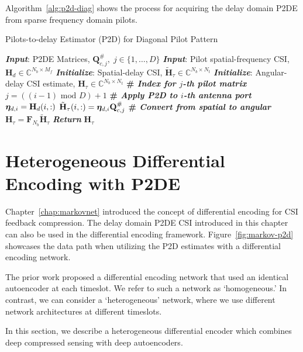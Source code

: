 Algorithm~\ref{alg:p2d-diag} shows the process for acquiring the delay domain P2DE from sparse frequency domain pilots.

\begin{algorithm}
    \caption{Pilots-to-delay Estimator (P2D) for Diagonal Pilot Pattern} 
    \label{alg:p2d-diag}
    \begin{algorithmic}[1]
    \State \textbf{\emph{Input}}:
        P2DE Matrices, $\mathbf{Q}_{c,j}^\#,\;
        j\in\{1,\dots, D\}$
    \State \textbf{\emph{Input}}: Pilot spatial-frequency CSI, $\mathbf{H}_d\in\mathbb{C}^{N_b\times M_f}$
    \State \textbf{\emph{Initialize}}: Spatial-delay CSI, $\tilde{\mathbf{H}}_\tau\in\mathbb{C}^{N_b\times N_t}$
   \State \textbf{\emph{Initialize}}: Angular-delay CSI estimate, ${\mathbf{H}}_\tau
              \in\mathbb{C}^{N_b\times N_t}$
        \State \textbf{\# \emph{Index for $j$-th pilot matrix}}
        \State $j = ((i-1) \text{ mod } D) + 1$
        \State \textbf{\# \emph{Apply P2D to $i$-th antenna port}}
        \State ${\boldsymbol{\eta}}_{d,i} = \mathbf{H}_d(i,:)$
        \State $\tilde{{\mathbf{H}}}_{\tau}(i,:) = {\boldsymbol{\eta}}_{d,i}\mathbf{Q}^{\#}_{c,j}$
        \EndFor
        \State \textbf{\# \emph{Convert from spatial to angular}}
        \State ${{\mathbf{H}}}_{\tau}=\mathbf{F}_{N_b}\tilde{{\mathbf{H}}}_{\tau}$
        \State \textbf{\emph{Return}} ${{\mathbf{H}}}_{\tau}$
    \end{algorithmic} 
\end{algorithm}

\section{Heterogeneous Differential Encoding with P2DE}
\label{sect:hetero-markov}

Chapter~\ref{chap:markovnet} introduced the concept of differential encoding for CSI feedback compression. The delay domain P2DE CSI introduced in this chapter can also be used in the differential encoding framework. Figure~\ref{fig:markov-p2d} showcases the data path when utilizing the P2D estimates with a differential encoding network.

The prior work proposed a differential encoding network that used an identical autoencoder at each timeslot. We refer to such a network as `homogeneous.' In contrast, we can consider a `heterogeneous' network, where we use different network architectures at different timeslots.

In this section, we describe a heterogeneous differential encoder which combines deep compressed sensing with deep autoencoders.

